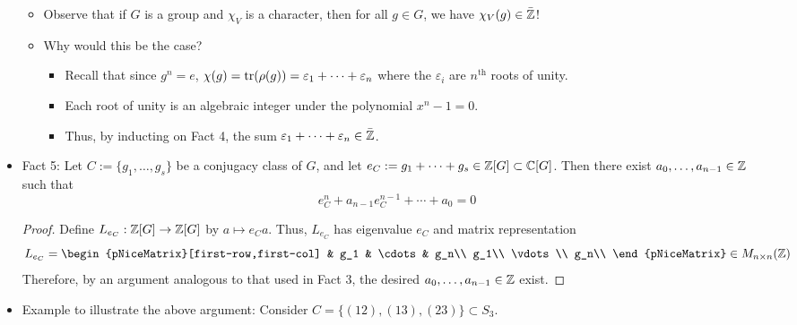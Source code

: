 \documentclass[../notes.tex]{subfiles}
\begin{document}
\begin{itemize}
    \begin{itemize}
        \item Observe that if $G$ is a group and $\chi_V$ is a character, then for all $g\in G$, we have $\chi_V(g)\in\bar{\mathbb{Z}}$!
        \item Why would this be the case?
        \begin{itemize}
            \item Recall that since $g^n=e$, $\chi(g)=\tr(\rho(g))=\varepsilon_1+\cdots+\varepsilon_n$ where the $\varepsilon_i$ are $n^\text{th}$ roots of unity.
            \item Each root of unity is an algebraic integer under the polynomial $x^n-1=0$.
            \item Thus, by inducting on Fact 4, the sum $\varepsilon_1+\cdots+\varepsilon_n\in\bar{\mathbb{Z}}$.
        \end{itemize}
    \end{itemize}
    \item Fact 5: Let $C:=\{g_1,\dots,g_s\}$ be a conjugacy class of $G$, and let $e_C:=g_1+\cdots+g_s\in\mathbb{Z}[G]\subset\mathbb{C}[G]$. Then there exist $a_0,\dots,a_{n-1}\in\mathbb{Z}$ such that
    \begin{equation*}
        e_C^n+a_{n-1}e_C^{n-1}+\cdots+a_0 = 0
    \end{equation*}
    \begin{proof}
        Define $L_{e_C}:\mathbb{Z}[G]\to\mathbb{Z}[G]$ by $a\mapsto e_Ca$. Thus, $L_{e_C}$ has eigenvalue $e_C$ and matrix representation
        \begin{equation*}
            L_{e_C} =
            \begin{pNiceMatrix}[first-row,first-col]
                & g_1 & \cdots & g_n\\
                g_1\\
                \vdots\\
                g_n\\
            \end{pNiceMatrix}
            \in M_{n\times n}(\Z)
        \end{equation*}
        Therefore, by an argument analogous to that used in Fact 3, the desired $a_0,\dots,a_{n-1}\in\mathbb{Z}$ exist.
    \end{proof}
    \item Example to illustrate the above argument: Consider $C=\{(12),(13),(23)\}\subset S_3$.

\end{itemize}
\end{document}
